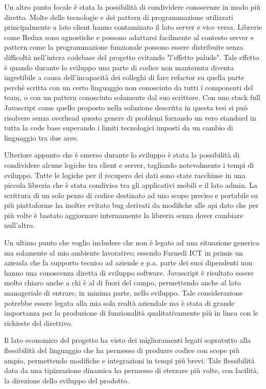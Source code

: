 \vspace{5mm}Un altro punto focale è stata la possibilità di condividere conoscenze in modo più diretto. Molte delle tecnologie e dei pattern di programmazione utilizzati principalmente a lato client hanno contaminato il lato server e vice versa. Librerie come Redux sono agnostiche e possono adattarsi facilmente al contesto server e pattern come la programmazione funzionale possono essere distribuite senza difficoltà nell'intera codebase del progetto evitando "l'effetto palude". Tale effetto è quando durante lo sviluppo una parte di codice non mantenuta diventa ingestibile a causa dell'incapacità dei colleghi di fare refactor su quella parte perché scritta con un certo linguaggio non conosciuto da tutti i componenti del team, o con un pattern conosciuto solamente dal suo scrittore. Con uno stack full Javascript come quello proposto nella soluzione descritta in questa tesi si può risolvere senza overhead questo genere di problemi forzando un vero standard in tutta la code base superando i limiti tecnologici imposti da un cambio di linguaggio tra due aree.

\vspace{5mm}Ulteriore appunto che è emerso durante lo sviluppo è stata la possibilità di condividere alcune logiche tra client e server, tagliando notevolmente i tempi di sviluppo. Tutte le logiche per il recupero dei dati sono state racchiuse in una piccola libreria che è stata condivisa tra gli applicativi mobili e il lato admin. La scrittura di un solo pezzo di codice destinato ad uno scopo preciso e portabile su più piattaforme ha inoltre evitato bug derivati da modifiche alle api dato che per più volte è bastato aggiornare internamente la libreria senza dover cambiare null'altro.

\vspace{5mm}Un ultimo punto che voglio includere che non è legato ad una situazione generica ma solamente al mio ambiente lavorativo; essendo Farnedi ICT in primis un azienda che fa supporto tecnico ad aziende e p.a. parte dei suoi dipendenti non hanno una conoscenza diretta di sviluppo software. Javascript è risultato essere molto chiaro anche a chi è al di fuori del campo, permettendo anche al lato manageriale di entrare, in minima parte, nello sviluppo. Tale considerazione potrebbe essere legata alla mia sola realtà aziendale ma è stata di grande importanza per la produzione di funzionalità qualitativamente più in linea con le richieste del direttivo.

\vspace{5mm}Il lato economico del progetto ha visto dei miglioramenti legati sopratutto alla flessibilità del linguaggio che ha permesso di produrre codice con scope più ampio, permettendo modifiche e integrazioni in tempi più brevi. Tale flessibilità data da una tipizzazione dinamica ha permesso di sterzare più volte, con facilità, la direzione dello sviluppo del prodotto.


